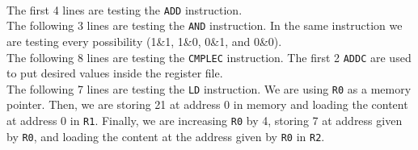 \documentclass[a4paper, 11pt, oneside]{article}
\begin{document}
\paragraph{}The first 4 lines are testing the \texttt{ADD} instruction.\\
The following 3 lines are testing the \texttt{AND} instruction. In the same instruction we are testing every possibility (1\&1, 1\&0, 0\&1, and 0\&0).\\
The following 8 lines are testing the \texttt{CMPLEC} instruction. The first 2 \texttt{ADDC} are used to put desired values inside the register file.\\
The following 7 lines are testing the \texttt{LD} instruction. We are using \texttt{R0} as a memory pointer. Then, we are storing 21 at address 0 in memory and loading the content at address 0 in \texttt{R1}. Finally, we are increasing \texttt{R0} by 4, storing 7 at address given by \texttt{R0}, and loading the content at the address given by \texttt{R0} in \texttt{R2}.
\end{document}
